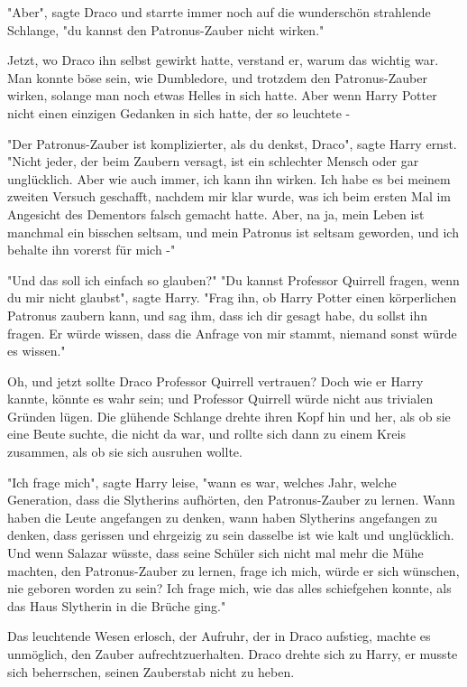 {"Aber", sagte Draco und starrte immer noch auf die wunderschön strahlende Schlange, "du kannst den Patronus-Zauber nicht wirken."

Jetzt, wo Draco ihn selbst gewirkt hatte, verstand er, warum das wichtig war. Man konnte böse sein, wie Dumbledore, und trotzdem den Patronus-Zauber wirken, solange man noch etwas Helles in sich hatte. Aber wenn Harry Potter nicht einen einzigen Gedanken in sich hatte, der so leuchtete -

"Der Patronus-Zauber ist komplizierter, als du denkst, Draco", sagte Harry ernst. "Nicht jeder, der beim Zaubern versagt, ist ein schlechter Mensch oder gar unglücklich. Aber wie auch immer, ich kann ihn wirken. Ich habe es bei meinem zweiten Versuch geschafft, nachdem mir klar wurde, was ich beim ersten Mal im Angesicht des Dementors falsch gemacht hatte. Aber, na ja, mein Leben ist manchmal ein bisschen seltsam, und mein Patronus ist seltsam geworden, und ich behalte ihn vorerst für mich -"

"Und das soll ich einfach so glauben?" "Du kannst Professor Quirrell fragen, wenn du mir nicht glaubst", sagte Harry. "Frag ihn, ob Harry Potter einen körperlichen Patronus zaubern kann, und sag ihm, dass ich dir gesagt habe, du sollst ihn fragen. Er würde wissen, dass die Anfrage von mir stammt, niemand sonst würde es wissen."

Oh, und jetzt sollte Draco Professor Quirrell vertrauen? Doch wie er Harry kannte, könnte es wahr sein; und Professor Quirrell würde nicht aus trivialen Gründen lügen. Die glühende Schlange drehte ihren Kopf hin und her, als ob sie eine Beute suchte, die nicht da war, und rollte sich dann zu einem Kreis zusammen, als ob sie sich ausruhen wollte.

"Ich frage mich", sagte Harry leise, "wann es war, welches Jahr, welche Generation, dass die Slytherins aufhörten, den Patronus-Zauber zu lernen. Wann haben die Leute angefangen zu denken, wann haben Slytherins angefangen zu denken, dass gerissen und ehrgeizig zu sein dasselbe ist wie kalt und unglücklich. Und wenn Salazar wüsste, dass seine Schüler sich nicht mal mehr die Mühe machten, den Patronus-Zauber zu lernen, frage ich mich, würde er sich wünschen, nie geboren worden zu sein? Ich frage mich, wie das alles schiefgehen konnte, als das Haus Slytherin in die Brüche ging."

Das leuchtende Wesen erlosch, der Aufruhr, der in Draco aufstieg, machte es unmöglich, den Zauber aufrechtzuerhalten. Draco drehte sich zu Harry, er musste sich beherrschen, seinen Zauberstab nicht zu heben.

}
